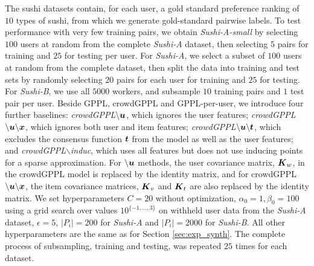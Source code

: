 The sushi datasets contain, for each user, a gold standard preference ranking 
of $10$ types of sushi,
from which we generate gold-standard pairwise labels. 
To test performance with very few training pairs, we obtain \emph{Sushi-A-small}
by selecting $100$ users at random from the complete \emph{Sushi-A} dataset,
then selecting $5$ pairs for training and $25$ for testing per user.
For \emph{Sushi-A}, we select a subset of $100$ users at random from the complete dataset, then 
split the data into training and test sets by randomly
selecting $20$ pairs for each user for training and $25$ for testing. 
For \emph{Sushi-B}, we use all $5000$ workers, and subsample $10$ training pairs and $1$ test pair per user.
Beside GPPL, crowdGPPL and GPPL-per-user, we 
introduce four further baselines: 
\emph{crowdGPPL$\mathbf{\backslash \boldsymbol u}$}, which ignores the user features;
 \emph{crowdGPPL$\mathbf{\backslash \boldsymbol u \backslash \boldsymbol x}$}, which ignores both user and item features;
 \emph{crowdGPPL$\mathbf{\backslash \boldsymbol u \backslash \boldsymbol t}$}, which 
excludes the consensus function $\boldsymbol t$ from the model as well as the user
features;
and  \emph{crowdGPPL$\backslash$induc}, which uses all features but does 
not use inducing points for a sparse approximation.
For $\backslash\boldsymbol u$ methods, the user covariance matrix, $\boldsymbol K_w$, in the crowdGPPL model is replaced by the identity matrix, and for crowdGPPL$\mathbf{\backslash \boldsymbol u \backslash \boldsymbol x}$, the item covariance matrices, $\boldsymbol K_v$ and $\boldsymbol K_t$ are also replaced by the identity matrix.
We set hyperparameters $C=20$ without optimization,
$\alpha_0=1, \beta_0=100$ using a grid search over values 
$10^{\{-1,...,3\}}$ on withheld user data from the \emph{Sushi-A} dataset,
$\epsilon=5$, $|P_i|=200$ for \emph{Sushi-A} and $|P_i|=2000$ for \emph{Sushi-B}. All other hyperparameters are the same 
as for Section \ref{sec:exp_synth}.
The complete process of subsampling, training and testing, was repeated $25$ times
for each dataset.

